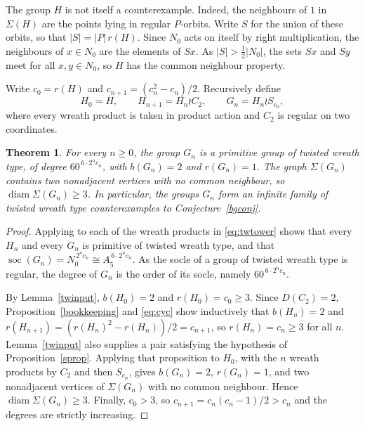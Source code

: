 \documentclass[a4paper,reqno,11pt]{amsart}
\newcommand\diam{\operatorname{diam}}
\newtheorem{thm}{Theorem}[section]
\numberwithin{equation}{section}
\begin{document}
The group $H$ is not itself a counterexample. Indeed, the neighbours of $1$ in $\Sigma(H)$ are the points lying in regular $P$-orbits. Write $S$ for the union of these orbits, so that $|S|=|P|\,r(H)$. Since $N_0$ acts on itself by right multiplication, the neighbours of $x\in N_0$ are the elements of $Sx$. As $|S|>\tfrac12|N_0|$, the sets $Sx$ and $Sy$ meet for all $x,y\in N_0$, so $H$ has the common neighbour property.

Write $c_0=r(H)$ and $c_{n+1}=(c_n^2-c_n)/2$. Recursively define
\begin{equation}\label{eq:twtower}
H_0=H,\qquad
H_{n+1}=H_n\wr C_2,\qquad
G_n=H_n\wr S_{c_n},
\end{equation}
where every wreath product is taken in product action and $C_2$ is regular on two coordinates.

\begin{thm}\label{twfamilythm}
For every $n\ge0$, the group $G_n$ is a primitive group of twisted wreath type, of degree $60^{\,6\cdot2^nc_n}$, with $b(G_n)=2$ and $r(G_n)=1$. The graph $\Sigma(G_n)$ contains two nonadjacent vertices with no common neighbour, so $\diam\Sigma(G_n)\ge3$. In particular, the groups $G_n$ form an infinite family of twisted wreath type counterexamples to Conjecture~\ref{bgconj}.
\end{thm}

\begin{proof}
Applying \cite[Lemma~4.9]{F} to each of the wreath products in \eqref{eq:twtower} shows that every $H_n$ and every $G_n$ is primitive of twisted wreath type, and that $\operatorname{soc}(G_n)=N_0^{\,2^nc_n}\cong A_5^{\,6\cdot2^nc_n}$. As the socle of a group of twisted wreath type is regular, the degree of $G_n$ is the order of its socle, namely $60^{\,6\cdot2^nc_n}$.

By Lemma~\ref{twinput}, $b(H_0)=2$ and $r(H_0)=c_0\ge3$. Since $D(C_2)=2$, Proposition~\ref{bookkeeping} and \eqref{eq:cyc} show inductively that $b(H_n)=2$ and $r(H_{n+1})=(r(H_n)^2-r(H_n))/2=c_{n+1}$, so $r(H_n)=c_n\ge3$ for all $n$. Lemma~\ref{twinput} also supplies a pair satisfying the hypothesis of Proposition~\ref{sprop}. Applying that proposition to $H_0$, with the $n$ wreath products by $C_2$ and then $S_{c_n}$, gives $b(G_n)=2$, $r(G_n)=1$, and two nonadjacent vertices of $\Sigma(G_n)$ with no common neighbour. Hence $\diam\Sigma(G_n)\ge3$. Finally, $c_0>3$, so $c_{n+1}=c_n(c_n-1)/2>c_n$ and the degrees are strictly increasing.
\end{proof}
\end{document}
